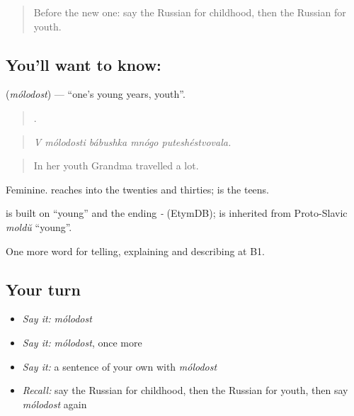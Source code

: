 \label{lesson:RU-C304-molodost}



\begin{quote}
Before the new one: say the Russian for childhood, then the Russian for youth.
\end{quote}

\subsection*{You'll want to know: }
\textbf{} (\emph{mólodost}) — \textquotedblleft{}one's young years, youth\textquotedblright{}.

\begin{quote}
    .
\end{quote}

\begin{quote}
\emph{V mólodosti bábushka mnógo puteshéstvovala.}
\end{quote}

\begin{quote}
In her youth Grandma travelled a lot.
\end{quote}

Feminine. \emph{} reaches into the twenties and thirties; \emph{} is the teens.

\begin{cousinweb}
\emph{} is built on \emph{} \textquotedblleft{}young\textquotedblright{} and the ending \emph{-} (EtymDB); \emph{} is inherited from Proto-Slavic \emph{moldŭ} \textquotedblleft{}young\textquotedblright{}.
\end{cousinweb}

\begin{grammarlens}[title={What you've built}]
One more word for telling, explaining and describing at B1.
\end{grammarlens}

\subsection*{Your turn}
\begin{itemize}
\raggedright
  \item \emph{Say it:} \emph{mólodost}
  \item \emph{Say it:} \emph{mólodost}, once more
  \item \emph{Say it:} a sentence of your own with \emph{mólodost}
  \item \emph{Recall:} say the Russian for childhood, then the Russian for youth, then say \emph{mólodost} again
\end{itemize}

